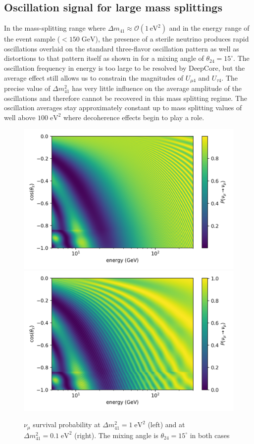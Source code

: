 \subsection{Oscillation signal for large mass splittings}
In the mass-splitting range where $\Delta m_{41}\approx\mathcal{O}(1\,\mathrm{eV^2})$ and in the energy range of the event sample ($<150\;\mathrm{GeV}$), the presence of a sterile neutrino produces rapid oscillations overlaid on the standard three-flavor oscillation pattern as well as distortions to that pattern itself as shown in  for a mixing angle of $\theta_{24}=15^\circ$.
The oscillation frequency in energy is too large to be resolved by DeepCore, but the average effect still allows us to constrain the magnitudes of $U_{\mu4}$ and $U_{\tau4}$.
The precise value of $\Delta m^2_{41}$ has very little influence on the average amplitude of the oscillations and therefore cannot be recovered in this mass splitting regime.
The oscillation averages stay approximately constant up to mass splitting values of well above $100\;\mathrm{eV^2}$ where decoherence effects begin to play a role\cite{atmo_decoherence}.
\begin{figure}
    \centering
    \includegraphics[width=0.45\linewidth]{figures/measurement/sterile_analysis/physics/dm41_1.0eV2_th24_15deg_avg_height_10-30km_ana_binning_range.png}
    \includegraphics[width=0.45\linewidth]{figures/measurement/sterile_analysis/physics/dm41_0.1eV2_th24_15deg_avg_height_10-30km_ana_binning_range.png}
    \caption{$\nu_{\mu}$ survival probability at $\Delta m^2_{41}=1\;\mathrm{eV^2}$ (left) and at $\Delta m^2_{41}=0.1\;\mathrm{eV^2}$ (right). The mixing angle is $\theta_{24}=15^\circ$ in both cases}
    \label{fig:numu_survival_1eV2_analysis_binning_range}
\end{figure}

